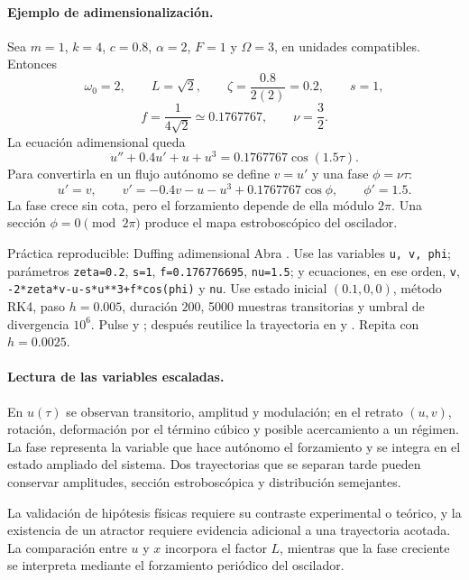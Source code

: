 \paragraph{Ejemplo de adimensionalización.}
Sea \(m=1\), \(k=4\), \(c=0.8\), \(\alpha=2\), \(F=1\) y \(\Omega=3\), en unidades
compatibles. Entonces
\[
 \omega_0=2,\qquad L=\sqrt2,\qquad
 \zeta=\frac{0.8}{2(2)}=0.2,\qquad
 s=1,
\]
\[
 f=\frac{1}{4\sqrt2}\simeq0.1767767,\qquad
 \nu=\frac32.
\]
La ecuación adimensional queda
\[
 u''+0.4u'+u+u^3=0.1767767\cos(1.5\tau).
\]
Para convertirla en un flujo autónomo se define \(v=u'\) y una fase
\(\phi=\nu\tau\):
\[
 u'=v,\qquad
 v'=-0.4v-u-u^3+0.1767767\cos\phi,\qquad
 \phi'=1.5.
\]
La fase crece sin cota, pero el forzamiento depende de ella módulo \(2\pi\). Una
sección \(\phi=0\pmod{2\pi}\) produce el mapa estroboscópico del oscilador.

\begin{activitybox}{Práctica reproducible: Duffing adimensional}
Abra . Use las variables \texttt{u, v, phi}; parámetros
\texttt{zeta=0.2}, \texttt{s=1}, \texttt{f=0.176776695},
\texttt{nu=1.5}; y ecuaciones, en ese orden,
\texttt{v},
\texttt{-2*zeta*v-u-s*u**3+f*cos(phi)} y \texttt{nu}.
Use estado inicial \((0.1,0,0)\), método RK4, paso \(h=0.005\), duración \(200\),
5000 muestras transitorias y umbral de divergencia \(10^6\). Pulse
 y ; después reutilice la trayectoria
en  y . Repita con \(h=0.0025\).
\end{activitybox}

\paragraph{Lectura de las variables escaladas.}
En \(u(\tau)\) se observan transitorio, amplitud y modulación; en el retrato
\((u,v)\), rotación, deformación por el término cúbico y posible acercamiento a un
régimen. La fase representa la variable que hace autónomo el forzamiento y se integra
en el estado ampliado del sistema. Dos trayectorias que se separan tarde pueden
conservar amplitudes, sección estroboscópica y distribución semejantes.

\begin{warningbox}
La validación de hipótesis físicas requiere su contraste experimental o teórico, y la
existencia de un atractor requiere evidencia adicional a una trayectoria acotada. La
comparación entre \(u\) y \(x\) incorpora el factor \(L\), mientras que la fase creciente
se interpreta mediante el forzamiento periódico del oscilador.
\end{warningbox}

